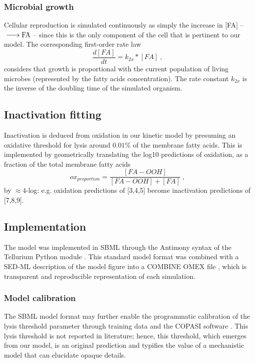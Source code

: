 \subsubsection{Microbial growth}
Cellular reproduction is simulated continuously as simply the increase in [FA] -- $\ce{->FA}$ -- since this is the only component of the cell that is pertinent to our model. The corresponding first-order rate law
\begin{equation}
    \frac{d[FA]}{dt} = k_{2x} * [FA]~,
\end{equation}
considers that growth is proportional with the current population of living microbes (represented by the fatty acids concentration). The rate constant $k_{2x}$ is the inverse of the doubling time of the simulated organism. 

\subsection{Inactivation fitting}

Inactivation is deduced from oxidation in our kinetic model by presuming an oxidative threshold for lysis around $0.01\%$ of the membrane fatty acids. This is implemented by geometrically translating the log10 predictions of oxidation, as a fraction of the total membrane fatty acids
\begin{equation} \label{oxidation_proportion}
    ox_{proportion} = \frac{[FA-OOH]}{[FA-OOH]+[FA]}~,
\end{equation}
by $\approx 4$-log: e.g. oxidation predictions of [3,4,5] become inactivation predictions of [7,8,9]. 

\subsection{Implementation}
The model was implemented in SBML \cite{Keating2020Models} through the Antimony syntax of the Tellurium Python module \cite{Choi2018Tellurium:Biology}. This standard model format was combined with a SED-ML description of the model figure \cite{Waltemath2011ReproducibleLanguage} into a COMBINE OMEX file \cite{Bergmann2014COMBINEProject}, which is transparent and reproducible representation of each simulation. 
\subsubsection*{Model calibration}
The SBML model format may further enable the programmatic calibration of the lysis threshold parameter through training data and the COPASI software \cite{Bergmann2017COPASIBiotechnology}. This lysis threshold is not reported in literature; hence, this threshold, which emerges from our model, is an original prediction and typifies the value of a mechanistic model that can elucidate opaque details.

